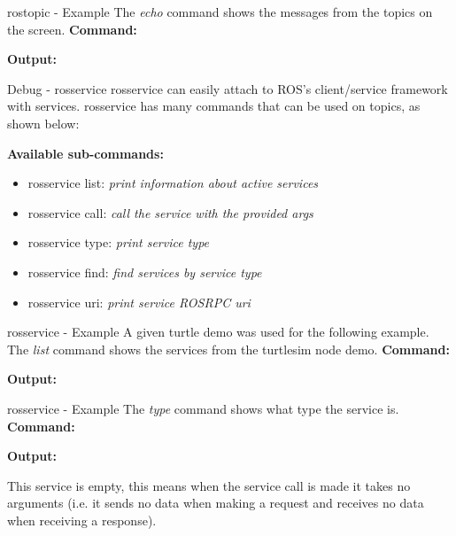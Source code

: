 \documentclass{beamer}
\begin{document}
\begin{frame}{rostopic - Example}
The \textit{echo} command shows the messages from the topics on the screen.
\newline
\textbf{Command:} 

\textbf{Output:}

\end{frame}
\begin{frame}{Debug - rosservice}
rosservice can easily attach to ROS's client/service framework with services. rosservice has many commands that can be used on topics, as shown below:
\newline
\newline
\begin{large}\textbf{Available sub-commands:}\end{large}
\begin{itemize}
	\item rosservice list:   \textit{ print information about active services}
	\item rosservice call:   \textit{call the service with the provided args}
	\item rosservice type:   \textit{print service type}    
	\item rosservice find:   \textit{find services by service type}
	\item rosservice uri:    \textit{ print service ROSRPC uri}
\end{itemize}
\end{frame}
\begin{frame}{rosservice - Example}
A given turtle demo was used for the following example.
\newline
The \textit{list} command shows the services from the turtlesim node demo.
\textbf{Command:} 


\textbf{Output:}

\end{frame}
\begin{frame}{rosservice - Example}
The \textit{type} command shows what type the service is.
\newline
\newline
\textbf{Command:} 

\textbf{Output:}

This service is empty, this means when the service call is made it takes no arguments (i.e. it sends no data when making a request and receives no data when receiving a response).
\end{frame}
\end{document}
